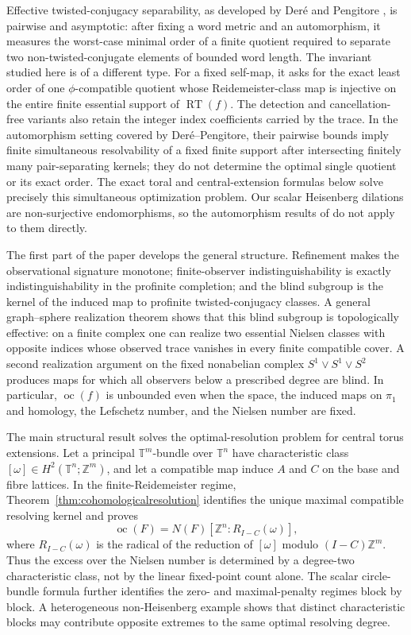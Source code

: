 \documentclass[11pt]{article}
\DeclareMathOperator{\oc}{oc}
\newcommand{\RT}{\operatorname{RT}}
\newcommand{\Z}{\mathbb Z}
\newcommand{\T}{\mathbb T}
\begin{document}
Effective twisted-conjugacy separability, as developed by Der\'e and
Pengitore \cite{DerePengitore}, is pairwise and asymptotic: after fixing a
word metric and an automorphism, it measures the worst-case minimal order of
a finite quotient required to separate two non-twisted-conjugate elements of
bounded word length.  The invariant studied here is of a different type.  For
a fixed self-map, it asks for the exact least order of one
$\phi$-compatible quotient whose Reidemeister-class map is injective on the
entire finite essential support of $\RT(f)$.  The detection and
cancellation-free variants also retain the integer index coefficients carried
by the trace.  In the automorphism setting covered by Der\'e--Pengitore,
their pairwise bounds imply finite simultaneous resolvability of a fixed
finite support after intersecting finitely many pair-separating kernels; they
do not determine the optimal single quotient or its exact order.  The exact
toral and central-extension formulas below solve precisely this simultaneous
optimization problem.  Our scalar Heisenberg dilations are non-surjective
endomorphisms, so the automorphism results of \cite{DerePengitore} do not
apply to them directly.

The first part of the paper develops the general structure.  Refinement makes
the observational signature monotone; finite-observer indistinguishability is
exactly indistinguishability in the profinite completion; and the blind
subgroup is the kernel of the induced map to profinite twisted-conjugacy
classes.  A general graph--sphere realization theorem shows that this blind
subgroup is topologically effective: on a finite complex one can realize two
essential Nielsen classes with opposite indices whose observed trace vanishes
in every finite compatible cover.  A second realization argument on the fixed
nonabelian complex $S^1\vee S^1\vee S^2$ produces maps for which all
observers below a prescribed degree are blind.  In particular, $\oc(f)$ is
unbounded even when the space, the induced maps on $\pi_1$ and homology, the
Lefschetz number, and the Nielsen number are fixed.

The main structural result solves the optimal-resolution problem for central
torus extensions.  Let a principal $\T^m$-bundle over $\T^n$ have
characteristic class $[\omega]\in H^2(\T^n;\Z^m)$, and let a compatible map
induce $A$ and $C$ on the base and fibre lattices.  In the finite-Reidemeister
regime, Theorem~\ref{thm:cohomologicalresolution} identifies the unique
maximal compatible resolving kernel and proves
\[
  \oc(F)=N(F)[\Z^n:R_{I-C}(\omega)],
\]
where $R_{I-C}(\omega)$ is the radical of the reduction of $[\omega]$ modulo
$(I-C)\Z^m$.  Thus the excess over the Nielsen number is determined by a
degree-two characteristic class, not by the linear fixed-point count alone.
The scalar circle-bundle formula further identifies the zero- and
maximal-penalty regimes block by block.  A heterogeneous non-Heisenberg
example shows that distinct characteristic blocks may contribute opposite
extremes to the same optimal resolving degree.
\end{document}
